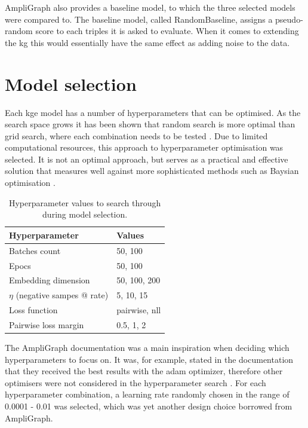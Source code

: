 AmpliGraph also provides a baseline model, to which the three selected models were compared to. The baseline model, called RandomBaseline, assigns a pseudo-random score to each triples it is asked to evaluate. When it comes to extending the \gls{kg} this would essentially have the same effect as adding noise to the data.

\section{Model selection}
Each \gls{kge} model has a number of hyperparameters that can be optimised. As the search space grows it has been shown that random search is more optimal than grid search, where each combination needs to be tested \cite{bergstra2012random}. Due to limited computational resources, this approach to hyperparameter optimisation was selected. It is not an optimal approach, but serves as a practical and effective solution that measures well against more sophisticated methods such as Baysian optimisation \cite{li2017hyperband}.

\begin{table}[htbp]
\centering
\begin{tabular}{|l|l|}
\hline
\textbf{Hyperparameter}      & \textbf{Values}             \\ \hline
Batches count       & 50, 100                              \\ \hline
Epocs               & 50, 100                          \\ \hline
Embedding dimension                   & 50, 100, 200                     \\ \hline
$\eta$ (negative sampes @ rate)     & 5, 10, 15                            \\ \hline
Loss function   & pairwise, nll                         \\ \hline
Pairwise loss margin    & 0.5, 1, 2                    \\ \hline
\end{tabular}
\caption[Hyperparameter values for model selection.]{Hyperparameter values to search through during model selection.}
\end{table}
The AmpliGraph documentation was a main inspiration when deciding which hyperparameters to focus on. It was, for example, stated in the documentation that they received the best results with the adam optimizer, therefore other optimisers were not considered in the hyperparameter search \cite{ampligraph_documentation}. For each hyperparameter combination, a learning rate randomly chosen in the range of 0.0001 - 0.01 was selected, which was yet another design choice borrowed from AmpliGraph.

